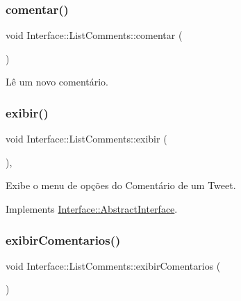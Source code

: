 \subsubsection{\texorpdfstring{comentar()}{comentar()}}
{\footnotesize\ttfamily void Interface\+::\+List\+Comments\+::comentar (\begin{DoxyParamCaption}{ }\end{DoxyParamCaption})\hspace{0.3cm}{\ttfamily [private]}}



Lê um novo comentário. 

\mbox{\label{class_interface_1_1_list_comments_a86ebab6e64dc979fd0f21bbeb142ec55}} 
\subsubsection{\texorpdfstring{exibir()}{exibir()}}
{\footnotesize\ttfamily void Interface\+::\+List\+Comments\+::exibir (\begin{DoxyParamCaption}{ }\end{DoxyParamCaption})\hspace{0.3cm}{\ttfamily [override]}, {\ttfamily [virtual]}}



Exibe o menu de opções do Comentário de um Tweet. 



Implements \hyperlink{class_interface_1_1_abstract_interface_af1a45726ea636cdbf1cf2d7daa5708be}{Interface\+::\+Abstract\+Interface}.

\mbox{\label{class_interface_1_1_list_comments_aa7b53cad1822bd5b2fc131e1a48271cb}} 
\subsubsection{\texorpdfstring{exibir\+Comentarios()}{exibirComentarios()}}
{\footnotesize\ttfamily void Interface\+::\+List\+Comments\+::exibir\+Comentarios (\begin{DoxyParamCaption}{ }\end{DoxyParamCaption})\hspace{0.3cm}{\ttfamily [private]}}



